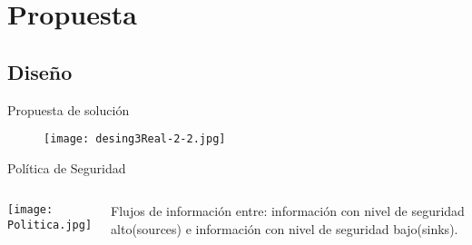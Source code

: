  \section{Propuesta}
 
\subsection{Diseño}
\begin{frame}{Propuesta de solución}
	\begin{figure}[t!]
		\begin{center} 
		\texttt{[image: desing3Real-2-2.jpg]} 
		\end{center}
	\end{figure}
\end{frame}
\begin{frame}{Política de Seguridad}
	\begin{columns}[c]
	\column{1.5in}
	\begin{center}
	\texttt{[image: Politica.jpg]} 
	\end{center}
	\column{1.5in}
	Flujos de información entre: información con nivel de seguridad alto(sources) e
	información con nivel de seguridad bajo(sinks).
	\end{columns}
\end{frame}

